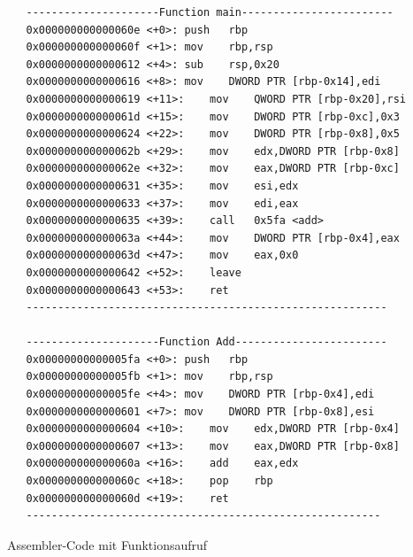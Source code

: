 \documentclass[12pt]{article}
\begin{document}
\begin{code}[!htb]
\begin{lstlisting}
   ---------------------Function main------------------------
   0x000000000000060e <+0>:	push   rbp
   0x000000000000060f <+1>:	mov    rbp,rsp
   0x0000000000000612 <+4>:	sub    rsp,0x20
   0x0000000000000616 <+8>:	mov    DWORD PTR [rbp-0x14],edi
   0x0000000000000619 <+11>:	mov    QWORD PTR [rbp-0x20],rsi
   0x000000000000061d <+15>:	mov    DWORD PTR [rbp-0xc],0x3
   0x0000000000000624 <+22>:	mov    DWORD PTR [rbp-0x8],0x5
   0x000000000000062b <+29>:	mov    edx,DWORD PTR [rbp-0x8]
   0x000000000000062e <+32>:	mov    eax,DWORD PTR [rbp-0xc]
   0x0000000000000631 <+35>:	mov    esi,edx
   0x0000000000000633 <+37>:	mov    edi,eax
   0x0000000000000635 <+39>:	call   0x5fa <add>
   0x000000000000063a <+44>:	mov    DWORD PTR [rbp-0x4],eax
   0x000000000000063d <+47>:	mov    eax,0x0
   0x0000000000000642 <+52>:	leave  
   0x0000000000000643 <+53>:	ret   
   ---------------------------------------------------------
   
   ---------------------Function Add------------------------
   0x00000000000005fa <+0>:	push   rbp
   0x00000000000005fb <+1>:	mov    rbp,rsp
   0x00000000000005fe <+4>:	mov    DWORD PTR [rbp-0x4],edi
   0x0000000000000601 <+7>:	mov    DWORD PTR [rbp-0x8],esi
   0x0000000000000604 <+10>:	mov    edx,DWORD PTR [rbp-0x4]
   0x0000000000000607 <+13>:	mov    eax,DWORD PTR [rbp-0x8]
   0x000000000000060a <+16>:	add    eax,edx
   0x000000000000060c <+18>:	pop    rbp
   0x000000000000060d <+19>:	ret    
   --------------------------------------------------------
\end{lstlisting}
\caption[Assembler Code Funktionen]{Assembler-Code mit Funktionsaufruf}
\end{code}
\end{document}

